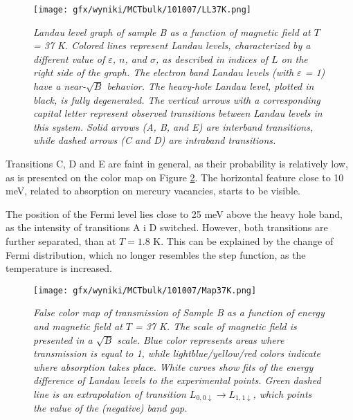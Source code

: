 \documentclass[titlepage,a4paper]{book}
\begin{document}
\begin{figure}[ht]
	\centering
	\texttt{[image: gfx/wyniki/MCTbulk/101007/LL37K.png]}
	\vspace{-10pt}
	\caption{\textit{Landau level graph of sample B as a function of magnetic field at $T$ = 37 K. Colored lines represent Landau levels, characterized by a different value of $\varepsilon$, $n$, and $\sigma$, as described in indices of $L$ on the right side of the graph. The electron band Landau levels (with $\varepsilon$ = 1) have a near-$\sqrt{B}$ behavior. The heavy-hole Landau level, plotted in black, is fully degenerated. The vertical arrows with a corresponding capital letter represent observed transitions between Landau levels in this system. Solid arrows (A, B, and E) are interband transitions, while dashed arrows (C and D) are intraband transitions. }}
	\label{fig:LL_101007_37K}
\end{figure}
Transitions C, D and E are faint in general, as their probability is relatively low, as is presented on the color map on Figure \ref{fig:Map_101007_37K}. The horizontal feature close to 10 meV, related to absorption on mercury vacancies, starts to be visible.

The position of the Fermi level lies close to 25 meV above the heavy hole band, as the intensity of transitions A i D switched. However, both transitions are further separated, than at $T = 1.8$ K. This can be explained by the change of Fermi distribution, which no longer resembles the step function, as the temperature is increased.

\begin{figure}[ht]
	\centering
	\texttt{[image: gfx/wyniki/MCTbulk/101007/Map37K.png]}
	\vspace{-10pt}
	\caption{\textit{False color map of transmission of Sample B as a function of energy and magnetic field at $T$ = 37 K. The scale of magnetic field is presented in a $\sqrt{B}$ scale. Blue color represents areas where transmission is equal to 1, while lightblue/yellow/red colors indicate where absorption takes place. White curves show fits of the energy difference of Landau levels to the experimental points. Green dashed line is an extrapolation of transition $L_{0,0\downarrow}\rightarrow L_{1,1\downarrow}$, which points the value of the (negative) band gap.}}
	\label{fig:Map_101007_37K}
\end{figure} 
\end{document}
